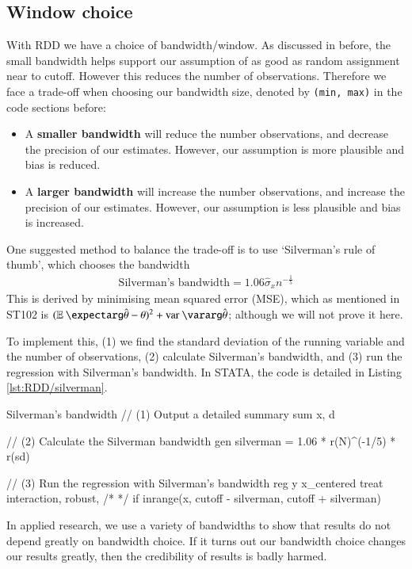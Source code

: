         \subsection{Window choice}
            With RDD we have a choice of bandwidth/window. As discussed in before, the small bandwidth helps support our assumption of as good as random assignment near to cutoff. However this reduces the number of observations. Therefore we face a trade-off when choosing our bandwidth size, denoted by \verb|(min, max)| in the code sections before:
            \begin{itemize}
                \item A \textbf{smaller bandwidth} will reduce the number observations, and decrease the precision of our estimates. However, our assumption is more plausible and bias is reduced.
                \item A \textbf{larger bandwidth} will increase the number observations, and increase the precision of our estimates. However, our assumption is less plausible and bias is increased.
            \end{itemize}
            One suggested method to balance the trade-off is to use `Silverman’s rule of thumb', which chooses the bandwidth
            \begin{align}
                \text{Silverman's bandwidth} = 1.06 \hat \sigma_x n^{-\frac{1}{5}}
            \end{align}
            This is derived by minimising mean squared error (MSE), which as mentioned in ST102 is $(\expect{\hat\theta} -\theta )^2 + \var{\hat\theta}$; although we will not prove it here.

            To implement this, (1) we find the standard deviation of the running variable and the number of observations, (2) calculate Silverman’s bandwidth, and (3) run the regression with Silverman’s bandwidth. In STATA, the code is detailed in Listing \ref{lst:RDD/silverman}.
            \begin{sexylisting}[colback=white, label=lst:RDD/silverman]{Silverman's bandwidth}
//  (1) Output a detailed summary
    sum x, d

//  (2) Calculate the Silverman bandwidth
    gen silverman = 1.06 * r(N)^(-1/5) * r(sd) 
    
//  (3) Run the regression with Silverman’s bandwidth
    reg y x_centered treat interaction, robust, /*
    */ if inrange(x, cutoff - silverman, cutoff + silverman) 
            \end{sexylisting}
            In applied research, we use a variety of bandwidths to show that results do not depend greatly on bandwidth choice. If it turns out our bandwidth choice changes our results greatly, then the credibility of results is badly harmed.


                




            

            